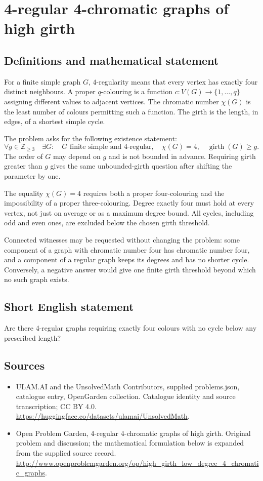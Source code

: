 \documentclass[11pt,a4paper]{article}
\begin{document}
\section*{4-regular 4-chromatic graphs of high girth}\label{statement}

\subsection{Definitions and mathematical statement}
For a finite simple graph $G$, $4$-regularity means
that every vertex has exactly four distinct neighbours.
A proper $q$-colouring is a function
$c:V(G)\to\{1,\ldots,q\}$ assigning different values
to adjacent vertices. The chromatic number $\chi(G)$
is the least number of colours permitting such a
function. The girth is the length, in edges, of a
shortest simple cycle.

The problem asks for the following existence statement:
\[
 \forall g\in\mathbb Z_{\geq3}\quad\exists G:
 \quad G\text{ finite simple and $4$-regular},\quad
 \chi(G)=4,\quad\operatorname{girth}(G)\geq g.
\]
The order of $G$ may depend on $g$ and is not bounded
in advance. Requiring girth greater than $g$ gives
the same unbounded-girth question after shifting
the parameter by one.

The equality $\chi(G)=4$ requires both a proper
four-colouring and the impossibility of a proper
three-colouring. Degree exactly four must hold at
every vertex, not just on average or as a maximum
degree bound. All cycles, including odd and even
ones, are excluded below the chosen girth threshold.

Connected witnesses may be requested without changing
the problem: some component of a graph with chromatic
number four has chromatic number four, and a component
of a regular graph keeps its degrees and has no
shorter cycle. Conversely, a negative answer would
give one finite girth threshold beyond which no
such graph exists.
\subsection{Short English statement}
Are there 4-regular graphs requiring exactly four colours with no cycle below any prescribed length?
\subsection{Sources}
\begin{itemize}
\item[S1] ULAM.AI and the UnsolvedMath Contributors, supplied problems.json, catalogue entry, OpenGarden collection. Catalogue identity and source transcription; CC BY 4.0.
\url{https://huggingface.co/datasets/ulamai/UnsolvedMath}.
\item[S2] Open Problem Garden, 4-regular 4-chromatic graphs of high girth. Original problem and discussion; the mathematical formulation below is expanded from the supplied source record.
\url{http://www.openproblemgarden.org/op/high_girth_low_degree_4_chromatic_graphs}.
\end{itemize}
\end{document}

